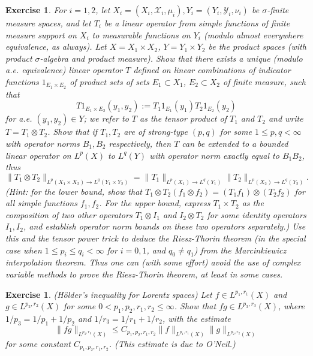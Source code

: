 \documentclass[10pt,reqno]{amsart}
\newtheorem{exercise}[theorem]{Exercise}
\begin{document}
\begin{exercise}
    For $i=1,2$, let $X_i = (X_i,{\mathcal X}_i, \mu_i), Y_i = (Y_i,{\mathcal Y}_i,\nu_i)$ be $\sigma$-finite measure spaces, and let $T_i$ be a linear operator from simple functions of finite measure support on $X_i$ to measurable functions on $Y_i$ (modulo almost everywhere equivalence, as always). Let $X = X_1 \times X_2$, $Y = Y_1 \times Y_2$ be the product spaces (with product $\sigma$-algebra and product measure). Show that there exists a unique (modulo a.e. equivalence) linear operator $T$ defined on linear combinations of indicator functions $1_{E_1 \times E_2}$ of product sets of sets $E_1 \subset X_1$, $E_2 \subset X_2$ of finite measure, such that
\[     T 1_{E_1 \times E_2}(y_1,y_2) := T_1 1_{E_1}(y_1) T_2 1_{E_2} (y_2)\]
    for a.e. $(y_1,y_2) \in Y$; we refer to $T$ as the \emph{tensor product} of $T_1$ and $T_2$ and write $T = T_1 \otimes T_2$. Show that if $T_1, T_2$ are of strong-type $(p,q)$ for some $1 \leq p,q < \infty$ with operator norms $B_1,B_2$ respectively, then $T$ can be extended to a bounded linear operator on $L^p(X)$ to $L^q(Y)$ with operator norm exactly equal to $B_1 B_2$, thus
\[     \| T_1 \otimes T_2 \|_{L^p(X_1 \times X_2) \rightarrow L^q(Y_1 \times Y_2)} = \| T_1 \|_{L^p(X_1) \rightarrow L^q(Y_1)} \| T_2 \|_{L^p(X_2) \rightarrow L^q(Y_2)}.\]
    (Hint: for the lower bound, show that $T_1 \otimes T_2(f_1 \otimes f_2) = (T_1 f_1) \otimes (T_2 f_2)$ for all simple functions $f_1,f_2$. For the upper bound, express $T_1 \times T_2$ as the composition of two other operators $T_1 \otimes I_1$ and $I_2 \otimes T_2$ for some identity operators $I_1, I_2$, and establish operator norm bounds on these two operators separately.) Use this and the tensor power trick to deduce the Riesz-Thorin theorem (in the special case when $1 \leq p_i \leq q_i < \infty$ for $i=0,1$, and $q_0 \neq q_1$) from the Marcinkiewicz interpolation theorem. Thus one can (with some effort) avoid the use of complex variable methods to prove the Riesz-Thorin theorem, at least in some cases. 
\end{exercise}

\begin{exercise}
    (Hölder’s inequality for Lorentz spaces) Let $f \in L^{p_1,r_1}(X)$ and $g \in L^{p_2,r_2}(X)$ for some $0 < p_1,p_2,r_1,r_2 \leq \infty$. Show that $fg \in L^{p_3,r_3}(X)$, where $1/p_3=1/p_1+1/p_2$ and $1/r_3=1/r_1+1/r_2$, with the estimate
    \[     \|fg\|_{L^{p_3,r_3}(X)} \leq C_{p_1,p_2,r_1,r_2} \|f\|_{L^{p_1,r_1}(X)} \|g\|_{L^{p_2,r_2}(X)}\]
    for some constant $C_{p_1,p_2,r_1,r_2}$. (This estimate is due to \emph{O’Neil}.) 
\end{exercise}
\end{document}
